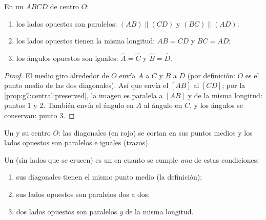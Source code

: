 \begin{theorem}\label{thm:g7:central:properties}
En un  $ABCD$ de centro $O$:
\begin{enumerate}
  \item los lados opuestos son paralelos: $(AB) \parallel (CD)$ y
        $(BC) \parallel (AD)$;
  \item los lados opuestos tienen la misma longitud: $AB = CD$ y
        $BC = AD$;
  \item los ángulos opuestos son iguales: $\widehat A = \widehat C$ y
        $\widehat B = \widehat D$.
\end{enumerate}
\end{theorem}

\begin{proof}
El medio giro alrededor de $O$ envía $A$ a $C$ y $B$ a $D$ (por definición:
$O$ es el punto medio de las dos diagonales). Así que envía el 
$[AB]$ al  $[CD]$; por la
\cref{prop:g7:central:preserved}, la imagen es paralela a $[AB]$ y
de la misma longitud: puntos 1 y 2. También envía el ángulo en $A$
al ángulo en $C$, y los ángulos se conservan: punto 3.
\end{proof}

\begin{omfigure}

{\small Un  y su centro $O$: las diagonales (en rojo) se cortan
en sus puntos medios y los lados opuestos son paralelos e iguales
(trazos).}
\end{omfigure}

\begin{theorem}\label{thm:g7:central:recognize}
Un  (sin lados que se crucen) es un  en cuanto se cumple
\emph{una} de estas condiciones:
\begin{enumerate}
  \item sus diagonales tienen el mismo punto medio (la definición);
  \item sus lados opuestos son paralelos dos a dos;
  \item dos lados opuestos son paralelos \emph{y} de la misma longitud.
\end{enumerate}
\end{theorem}
\admitted

